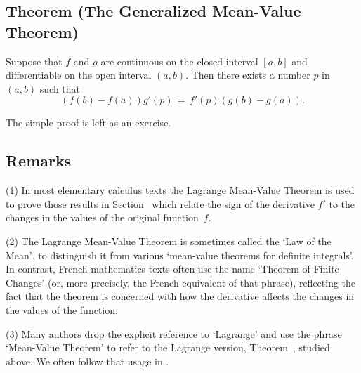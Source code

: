 \V

             \subsection{\small{\bf Theorem} (The Generalized Mean-Value Theorem)}
            \label{ThmE50.45}

\V

        Suppose that $f$ and $g$ are continuous on the closed interval $[a,b]$ and differentiable on the open interval $(a,b)$.
    Then there exists a number $p$ in $(a,b)$ such that
        \begin{equation}
        \label{EqnE.110B}
        (f(b)-f(a))g'(p) \,=\, f'(p)(g(b) - g(a)).
        \end{equation}

\V

        The simple proof is left as an exercise. \Q

\VV

             \subsection{\small{\bf Remarks}}
            \label{RemrkE50.50}

\V


\hspace*{\parindent}(1) In most elementary calculus texts the Lagrange Mean-Value Theorem is used to prove those results in Section~
    which relate the sign of the derivative $f'$ to the changes in the values of the original function~$f$.

\V

        (2) The Lagrange Mean-Value Theorem is sometimes called the `Law of the Mean', to distinguish it from various
    `mean-value theorems for definite integrals'. In contrast, French mathematics texts often use the name
    `Theorem of Finite Changes' (or, more precisely, the French equivalent of that phrase),
    reflecting the fact that the theorem is concerned with how the derivative affects the changes in the values of the function.

\V

        (3) Many authors drop the explicit reference to `Lagrange' and use the phrase `Mean-Value Theorem' to refer to the Lagrange version, 
    Theorem~, studied above. We often follow that usage in {\ThisText}.

\V

